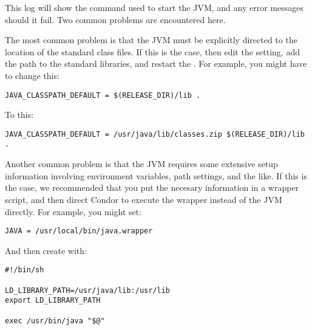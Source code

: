This log will show the command used to start the JVM, and
any error messages should it fail.  Two common problems
are encountered here.

The most common problem is that the JVM
must be explicitly directed to the location
of the standard class files.  If this is the case, then
edit the  setting, add the
path to the standard libraries, and restart the .
For example, you might have to change this:

\begin{verbatim}
JAVA_CLASSPATH_DEFAULT = $(RELEASE_DIR)/lib .
\end{verbatim}

To this:

\begin{verbatim}
JAVA_CLASSPATH_DEFAULT = /usr/java/lib/classes.zip $(RELEASE_DIR)/lib .
\end{verbatim}

Another common problem is that the JVM requires some extensive 
setup information involving environment variables, path settings,
and the like. If this is the case, we recommended that you put
the necesary information in a wrapper script, and then direct Condor to
execute the wrapper instead of the JVM directly.  For example,
you might set:

\begin{verbatim}
JAVA = /usr/local/bin/java.wrapper
\end{verbatim}

And then create  with:

\begin{verbatim}
#!/bin/sh

LD_LIBRARY_PATH=/usr/java/lib:/usr/lib
export LD_LIBRARY_PATH

exec /usr/bin/java "$@"
\end{verbatim}
